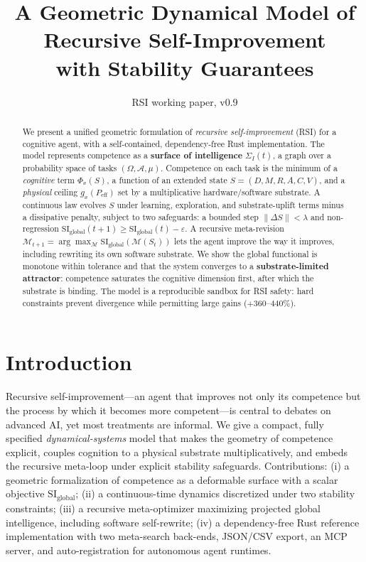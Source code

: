 \documentclass[11pt]{article}
\title{A Geometric Dynamical Model of Recursive Self-Improvement\\
with Stability Guarantees}
\author{RSI working paper, v0.9}
\date{}
\newcommand{\SI}{\mathrm{SI}_{\text{global}}}
\newcommand{\Peff}{P_{\text{eff}}}
\begin{document}
\maketitle

\begin{abstract}
We present a unified geometric formulation of \emph{recursive self-improvement}
(RSI) for a cognitive agent, with a self-contained, dependency-free Rust
implementation. The model represents competence as a \textbf{surface of
intelligence} $\Sigma_I(t)$, a graph over a probability space of tasks
$(\Omega,\mathcal{A},\mu)$. Competence on each task is the minimum of a
\emph{cognitive} term $\Phi_x(S)$, a function of an extended state
$S=(D,M,R,A,C,V)$, and a \emph{physical} ceiling $g_x(\Peff)$ set by a
multiplicative hardware/software substrate. A continuous law evolves $S$ under
learning, exploration, and substrate-uplift terms minus a dissipative penalty,
subject to two safeguards: a bounded step $\lVert\Delta S\rVert<\lambda$ and
non-regression $\SI(t{+}1)\ge\SI(t)-\varepsilon$. A recursive meta-revision
$\mathcal{M}_{t+1}=\arg\max_{\mathcal{M}}\SI(\mathcal{M}(S_t))$ lets the agent
improve the way it improves, including rewriting its own software substrate. We
show the global functional is monotone within tolerance and that the system
converges to a \textbf{substrate-limited attractor}: competence saturates the
cognitive dimension first, after which the substrate is binding. The model is a
reproducible sandbox for RSI safety: hard constraints prevent divergence while
permitting large gains ($+360$--$440\%$).
\end{abstract}

\section{Introduction}
Recursive self-improvement---an agent that improves not only its competence but
the process by which it becomes more competent---is central to debates on
advanced AI, yet most treatments are informal. We give a compact, fully
specified \emph{dynamical-systems} model that makes the geometry of competence
explicit, couples cognition to a physical substrate multiplicatively, and embeds
the recursive meta-loop under explicit stability safeguards. Contributions:
(i) a geometric formalization of competence as a deformable surface with a
scalar objective $\SI$; (ii) a continuous-time dynamics discretized under two
stability constraints; (iii) a recursive meta-optimizer maximizing projected
global intelligence, including software self-rewrite; (iv) a dependency-free
Rust reference implementation with two meta-search back-ends, JSON/CSV export,
an MCP server, and auto-registration for autonomous agent runtimes.
\end{document}
